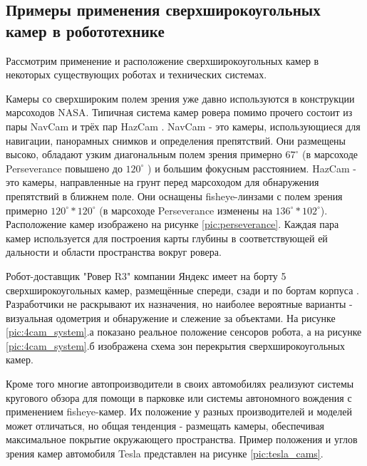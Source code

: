 \subsection{Примеры применения сверхширокоугольных камер в робототехнике }

Рассмотрим применение и расположение сверхширокоугольных камер в некоторых существующих роботах и 
технических системах.

Камеры со сверхшироким полем зрения уже давно используются в конструкции марсоходов NASA. Типичная система 
камер ровера помимо прочего состоит из пары NavCam и трёх пар HazCam \cite{opportunity}. NavCam - это камеры, использующиеся для навигации,
 панорамных снимков и определения препятствий. Они размещены высоко, обладают узким диагональным полем зрения примерно $67^\circ$ (в марсоходе 
Perseverance повышено до $120^\circ$ \cite{perseverance}) и большим фокусным расстоянием. HazCam - это камеры, направленные на грунт перед марсоходом для обнаружения 
 препятствий в ближнем поле. Они оснащены fisheye-линзами с полем зрения примерно $120^\circ * 120^\circ$ (в марсоходе Perseverance изменены на $136^\circ * 102^\circ$).
Расположение камер изображено на рисунке \ref{pic:perseverance}. Каждая пара камер используется для построения карты глубины в соответствующей ей дальности 
и области пространства вокруг ровера. 


Робот-доставщик "Ровер R3"  компании Яндекс имеет на борту 5 сверхширокоугольных камер, 
размещённые спереди, сзади и по бортам корпуса \cite{yandex_rover}. Разработчики не раскрывают их назначения, но наиболее 
вероятные варианты - визуальная одометрия и обнаружение и слежение за объектами. %
На рисунке \ref{pic:4cam_system}.а показано реальное положение сенсоров робота, а на рисунке \ref{pic:4cam_system}.б 
изображена схема зон перекрытия сверхширокоугольных камер. 

 
Кроме того многие автопроизводители в своих автомобилях реализуют системы кругового обзора для помощи в парковке или 
системы автономного вождения с применением fisheye-камер. Их положение у разных производителей и моделей может отличаться, 
но общая тенденция - размещать камеры, обеспечивая максимальное покрытие окружающего пространства. Пример положения и 
углов зрения камер автомобиля Tesla представлен на рисунке \ref{pic:tesla_cams}. 

